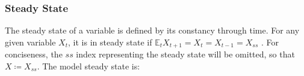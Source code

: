\documentclass[
	thesis.tex
	]{subfiles}
\begin{document}


\subsubsection{Steady State}

The steady state of a variable is defined by its constancy through time. For any given variable $X_t$, it is in steady state if $\mathbb{E}_t X_{t+1} = X_t = X_{t-1} = X_{ss}$ \cite[p.41]{costa_junior_understanding_2016}. For conciseness, the $ss$ index representing the steady state will be omitted, so that $X \coloneq X_{ss}$. The model steady state is:

\end{document}
